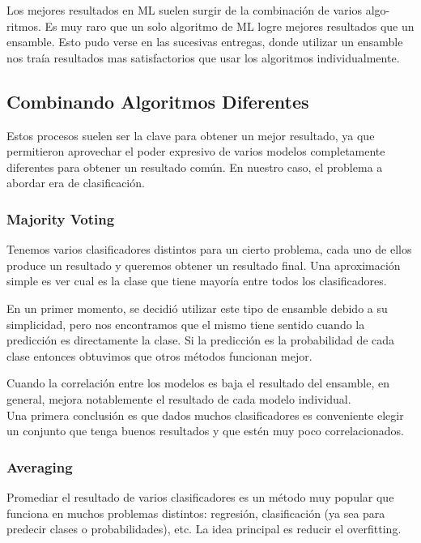 \documentclass[a4paper ,12pt]{article}
\begin{document}
Los mejores resultados en ML suelen surgir de la combinación de varios algo-
ritmos. Es muy raro que un solo algoritmo de ML logre mejores resultados que
un ensamble. Esto pudo verse en las sucesivas entregas, donde utilizar un ensamble nos traía resultados mas satisfactorios que usar los algoritmos individualmente.

\subsection{Combinando Algoritmos Diferentes}

Estos procesos suelen ser la clave para obtener un mejor resultado, ya que permitieron aprovechar el poder expresivo
de varios modelos completamente diferentes para obtener un resultado común.
En nuestro caso, el problema a abordar era de clasificación.

\subsubsection{Majority Voting}

Tenemos varios clasificadores distintos para un cierto problema, cada uno de ellos produce un resultado y queremos obtener un 
 resultado final. Una aproximación simple es ver cual es la clase que tiene mayoría entre todos los clasificadores.

En un primer momento, se decidió utilizar este tipo de ensamble debido a su simplicidad, 
pero nos encontramos que el mismo tiene sentido cuando la predicción es directamente la clase.
Si la predicción es la probabilidad de cada clase entonces obtuvimos que otros métodos funcionan mejor. 

Cuando la correlación entre los modelos es baja el resultado del ensamble, en general, mejora notablemente el resultado de cada modelo individual. 
\\

Una primera conclusión es que dados muchos clasificadores es conveniente elegir un conjunto que tenga buenos resultados y que estén muy poco correlacionados.

\subsubsection{Averaging}

Promediar el resultado de varios clasificadores es un método muy popular que
funciona en muchos problemas distintos: regresión, clasificación (ya sea para
predecir clases o probabilidades), etc. La idea principal es reducir el overfitting.
\end{document}
